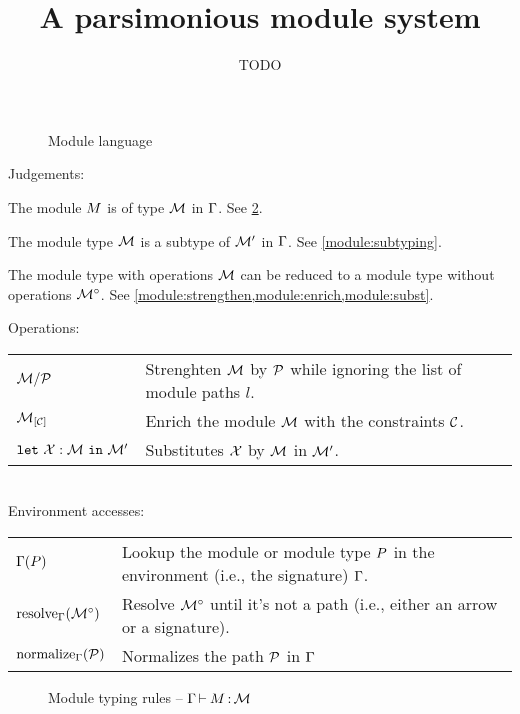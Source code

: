 \documentclass{article}
\title{A parsimonious module system}
\author{TODO}
\date{}
\theoremstyle{definition}
\newcommand\TODO[1]{{\textbf{\color{red}{TODO: #1}}}}
\begin{document}
\maketitle

\begin{figure}[!hb]
  
  \caption{Module language}
  \label{grammar}
\end{figure}

Judgements:\\
\begin{description}[align=right, leftmargin=3.5cm]
\item[$\wtm{\E}{\im}{\iM}$ :]
  The module $\im$ is of type $\iM$ in $\E$.
  See \cref{module:typing}.
\item[$\submod{\E}{\iM}{\iM'}{\iM_r}$ :]
  The module type $\iM$ is a subtype of $\iM'$ in $\E$.
  See \cref{module:subtyping}.
\item[$\Oreduce{\E}{\iM} = \iMO$ :]
  The module type with operations $\iM$ can be reduced to a module
  type without operations $\iMO$.
  See \cref{module:strengthen,module:enrich,module:subst}.
  \TODO{Change bracket style ...}
\end{description}

Operations:\\
\begin{tabular}{ll}
  $\Sstrengthen{l}{\iP}{\iM}$
  & Strenghten $\iM$ by $\iP$ while ignoring the list of module paths $l$.\\
  $\Senrich{\iC}{\iM}$
  & Enrich the module $\iM$ with the constraints $\iC$.\\
  $\Ssubst{\iX : \iM}{\iM'}$
  & Substitutes $\iX$ by $\iM$ in $\iM'$.
\end{tabular}\\

Environment accesses:\\
\begin{tabular}{ll}
  $\lookup{\E}{\ip}$
  & Lookup the module or module type $\ip$ in the environment (i.e., the signature)
    $\E$.\\
  $\resolve{\E}{\iMO}$
  & Resolve $\iMO$ until it's not a path (i.e., either an arrow or a signature).\\
  $\Onormalize{\E}{\iP}$
  & Normalizes the path $\iP$ in $\E$
\end{tabular}

\begin{figure}[tbp]
  \vspace{-3mm}
  \caption{Module typing rules -- $\wtm{\E}{\im}{\iM}$}
  \label{module:typing}
\end{figure}
\end{document}
